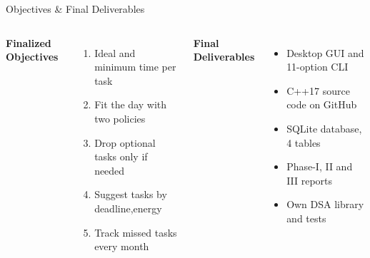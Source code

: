 \documentclass[aspectratio=169,11pt]{beamer}
\begin{document}
\begin{frame}{Objectives \& Final Deliverables}

\begin{columns}[T,totalwidth=\textwidth]


\textbf{\color{GEUBlue}Finalized Objectives}

\begin{enumerate}\itemsep3pt
    \item Ideal and minimum time per task
    \item Fit the day with two policies
    \item Drop optional tasks only if needed
    \item Suggest tasks by deadline,energy
    \item Track missed tasks every month
\end{enumerate}


\textbf{\color{GEUBlue}Final Deliverables}

\begin{itemize}\itemsep3pt
    \item Desktop GUI and 11-option CLI
    \item C++17 source code on GitHub
    \item SQLite database, 4 tables
    \item Phase-I, II and III reports
    \item Own DSA library and tests
\end{itemize}

\end{columns}

\vfill


\end{frame}
\end{document}

